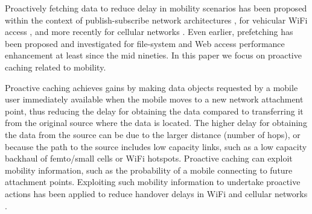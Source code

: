 \documentclass[conference]{IEEEtran}
\newcommand{\mynote}[1]{{{\medskip
\footnotesize \em \noindent Note: #1}}\medskip}
\renewcommand{\mynote}[1]{}
\begin{document}
\mynote{Motivation:
\begin{itemize}
\item Seamless mobility is important. Proactive caching or prefetching can be used to reduce the time for a mobile user to obtain his requested data.

\item Information for predicting a user/devices's  mobility is available.

\item Information of data a mobile/user requests is available, e.g. in ICN, or can be predicted (e.g. based on previous requests).

\item Two-level cache hierarchy: caches at the lower level can be located in e.g., hotspots, that belong to a particular provider or organization. The second level cache can be located close to the link interconnecting the provider or organization's network to the Internet.

\item Why not more than two-levels?

\item The concept of proactive caching is not new.
Problem we address is to efficiently utilize storage of caches that proactively fetch data, while achieving high performance in terms of reducing average delay. Also, approach is applied for variable data object sizes and a two-level hierarchy, and considers case where delay is independent and case where it depends on the object size.
\end{itemize}

}

Proactively fetching data  to reduce delay in mobility scenarios  has been proposed within the context of publish-subscribe network architectures  \cite{burcea2004disconnected,gaddah2010extending,siris2011selective}, for vehicular WiFi access \cite{Des++09}, and more recently for cellular networks \cite{Gol++12,Mal++12}. Even earlier, prefetching has been proposed and investigated for file-system and Web access performance enhancement at least since the mid nineties. In this paper we focus on proactive caching related to mobility.

Proactive caching  achieves gains by making data objects requested by a mobile user immediately available when the mobile moves to a new network attachment point, thus reducing the delay for obtaining the data compared to transferring it from the original source where the data is located. The higher delay for obtaining the data from the source can be due to the larger distance (number of hops), or because the path to the source includes low capacity links, such as a low capacity backhaul  of femto/small cells or WiFi hotspots.
Proactive caching can exploit mobility information, such as the probability of a  mobile connecting to  future  attachment points. Exploiting such mobility information to undertake proactive actions has been applied to reduce handover delays  in WiFi and cellular networks \cite{chiu2000predictive,soh2003qos,P++05}.
\end{document}
